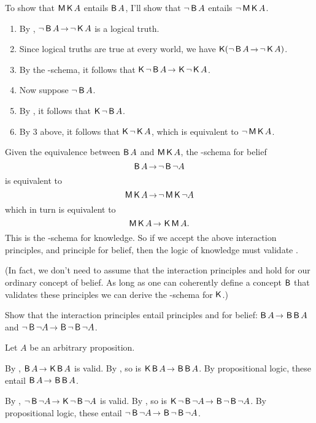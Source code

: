 To show that $\operatorname{\mathsf{M}}\operatorname{\mathsf{K}{}} A$ entails $\operatorname{\mathsf{B}} A$, I'll show that $\neg \operatorname{\mathsf{B}} A$
entails $\neg \operatorname{\mathsf{M}}\operatorname{\mathsf{K}{}} A$.
%
\begin{enumerate}[leftmargin=10mm]
  \itemsep-1mm
\item By , $\neg \Bel A \to \neg \Kn A$ is a logical truth.
\item Since logical truths are true at every world, we have $\Kn(\neg \Bel A \to \neg \Kn A)$.
\item By the -schema, it follows that $\Kn\neg \Bel A \to \Kn \neg \Kn A$.
\item Now suppose $\neg \operatorname{\mathsf{B}} A$.
\item By , it follows that $\operatorname{\mathsf{K}{}} \neg \operatorname{\mathsf{B}} A$.
\item By 3 above, it follows that $\operatorname{\mathsf{K}{}} \neg \operatorname{\mathsf{K}{}} A$, which is equivalent to $\neg \operatorname{\mathsf{M}}\operatorname{\mathsf{K}{}} A$.
\end{enumerate}

Given the equivalence between $\operatorname{\mathsf{B}} A$ and $\operatorname{\mathsf{M}}\operatorname{\mathsf{K}{}} A$, the -schema for
belief
\[
  \Bel A \to \neg \Bel\neg A
\]
is equivalent to
\[
  \Mi \Kn A \to \neg\Mi\Kn \neg A
\]
which in turn is equivalent to
\[
  \Mi \Kn A \to \Kn\Mi A.
\]
This is the -schema for knowledge. So if we accept the above interaction
principles, and principle  for belief, then the logic of knowledge must
validate .

(In fact, we don't need to assume that the interaction principles and 
hold for our ordinary concept of belief. As long as one can coherently define a
concept $\operatorname{\mathsf{B}}$ that validates these principles we can derive the -schema
for $\operatorname{\mathsf{K}{}}$.)

\begin{exercise}
  Show that the interaction principles entail principles  and  for
  belief: $\Bel A \to \Bel\Bel A$ and $\neg\Bel\neg A \to \Bel\neg\Bel\neg A$.
\end{exercise}
\begin{solution}
  Let $A$ be an arbitrary proposition.

  By , $\Bel A \to \Kn\Bel A$ is valid. By , so is
  $\Kn\Bel A \to \Bel\Bel A$. By propositional logic, these entail
  $\Bel A \to \Bel\Bel A$.

  By , $\neg \Bel \neg A \to \Kn\neg \Bel \neg A$ is valid. By ,
  so is $\Kn\neg \Bel \neg A \to \Bel\neg \Bel \neg A$. By propositional logic,
  these entail $\neg \Bel \neg A \to \Bel\neg \Bel \neg A$.
\end{solution}

